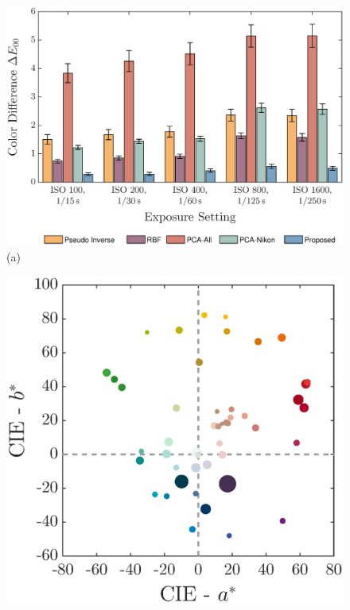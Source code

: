 \documentclass[9pt,twocolumn,twoside]{osajnl}
\providecommand{\DIFaddbeginFL}{} %
\providecommand{\DIFaddendFL}{} %
\providecommand{\DIFdelbeginFL}{} %
\providecommand{\DIFdelendFL}{} %
\begin{document}
	\begin{figure}[tbp]
		\centering
		\DIFdelbeginFL %
\DIFdelendFL \DIFaddbeginFL \begin{minipage}[b]{0.57\linewidth}
			\DIFaddendFL \centering
			\DIFdelbeginFL %
\DIFdelendFL \DIFaddbeginFL \includegraphics[width=\linewidth]{Fig12a}\DIFaddendFL \\
			(a)
		\end{minipage}%
		\DIFdelbeginFL %
\DIFdelendFL \DIFaddbeginFL \begin{minipage}[b]{0.43\linewidth}
			\DIFaddendFL \centering
			\DIFdelbeginFL %
\DIFdelendFL \DIFaddbeginFL \includegraphics[width=\linewidth]{Fig12b}\DIFaddendFL \\

\end{minipage}
\end{figure}
\end{document}
